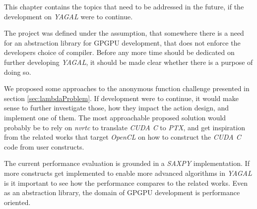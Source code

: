 This chapter contains the topics that need to be addressed in the future, if the development on \textit{YAGAL} were to continue.

The project was defined under the assumption, that somewhere there is a need for an abstraction library for GPGPU development, that does not enforce the developers choice of compiler. Before any more time should be dedicated on further developing \textit{YAGAL}, it should be made clear whether there is a purpose of doing so.

We proposed some approaches to the anonymous function challenge presented in section \ref{sec:lambdaProblem}. If development were to continue, it would make sense to further investigate those, how they impact the action design, and implement one of them. The most approachable proposed solution would probably be to rely on \textit{nvrtc} to translate \textit{CUDA C} to \textit{PTX}, and get inspiration from the related works that target \textit{OpenCL} on how to construct the \textit{CUDA C} code from user constructs.

The current performance evaluation is grounded in a \textit{SAXPY} implementation. If more constructs get implemented to enable more advanced algorithms in \textit{YAGAL} is it important to see how the performance compares to the related works. Even as an abstraction library, the domain of GPGPU development is  performance oriented.